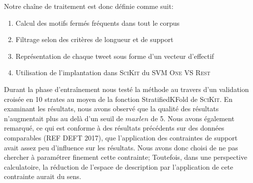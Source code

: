  Notre chaîne de traitement est donc définie comme suit:
\begin{enumerate}
  \item Calcul des motifs fermés fréquents dans tout le corpus
  \item Filtrage selon des critères de longueur et de support
  \item Représentation de chaque tweet sous forme d'un vecteur d'effectif
  \item Utilisation de l'implantation dans \textsc{SciKit} du SVM \textsc{One VS Rest}
\end{enumerate}

 
Durant la phase d'entraînement nous testé la méthode au travers d'un validation croisée en 10 strates au moyen de la fonction StratifiedKFold de \textsc{SciKit}. En examinant les résultats, nous avons observé que la qualité des résultats n'augmentait plus au delà d'un seuil de $maxlen$ de 5.
Nous avons également remarqué, ce qui est conforme à des résultats précédents sur des données comparables (REF DEFT 2017), que l'application des contraintes de support avait assez peu d'influence sur les résultats. Nous avons donc choisi de ne pas chercher à paramétrer finement cette contrainte; Toutefois, dans une perspective calculatoire, la réduction de l'espace de description par l'application de cete contrainte aurait du sens.
 
